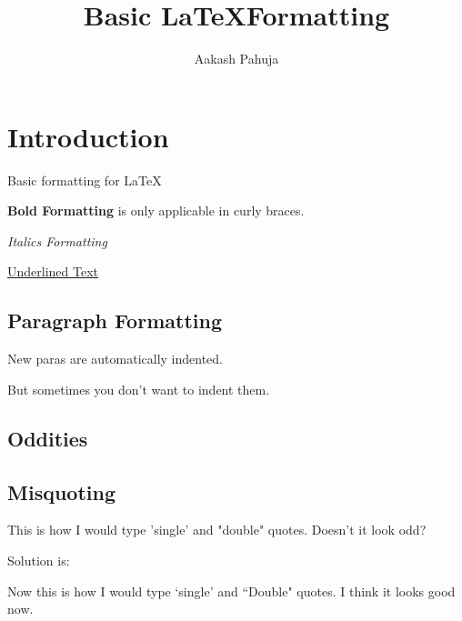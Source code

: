 \documentclass{article}
\title{Basic \LaTeX Formatting}
\author{Aakash Pahuja}
\date{}
\begin{document}
\maketitle

\section{Introduction}

Basic formatting for \LaTeX

\textbf{Bold Formatting} is only applicable in curly braces.

\emph{Italics Formatting}

\underline{Underlined Text}


\subsection{Paragraph Formatting}

New paras are automatically indented.

\noindent But sometimes you don't want to indent them.

\subsection{Oddities}

\subsection{Misquoting}

This is how I would type 'single' and "double" quotes. Doesn't it look odd?

\noindent Solution is:

\noindent Now this is how I would type `single' and ``Double" quotes. I think it looks good now.
\end{document}
